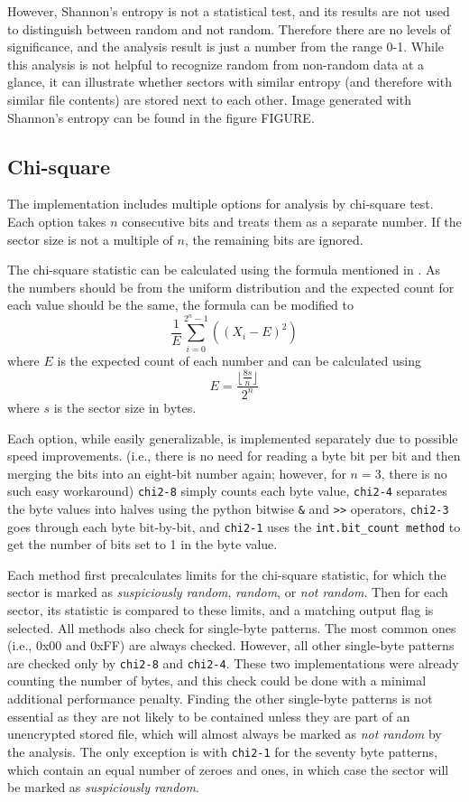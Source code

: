 \documentclass[
  digital, %
  oneside, %
  lof,     %
  lot,     %
]{fithesis4}
\begin{document}
However, Shannon's entropy is not a statistical test, and its results are not used to distinguish between random and not random.
Therefore there are no levels of significance, and the analysis result is just a number from the range 0-1.
While this analysis is not helpful to recognize random from non-random data at a glance, it can illustrate whether sectors with similar entropy (and therefore with similar file contents) are stored next to each other.
Image generated with Shannon's entropy can be found in the figure FIGURE.   %

\subsection{Chi-square}

The implementation includes multiple options for analysis by chi-square test.
Each option takes $n$ consecutive bits and treats them as a separate number.
If the sector size is not a multiple of $n$, the remaining bits are ignored.

The chi-square statistic can be calculated using the formula mentioned in \textbf{}.
As the numbers should be from the uniform distribution and the expected count for each value should be the same, the formula can be modified to
$$\frac{1}{E}\sum_{i = 0}^{2^n - 1}((X_i - E)^2)$$
where $E$ is the expected count of each number and can be calculated using 
$$E = \frac{\lfloor\frac{8s}{n}\rfloor}{2^n}$$
where $s$ is the sector size in bytes.

Each option, while easily generalizable, is implemented separately due to possible speed improvements. 
(i.e., there is no need for reading a byte bit per bit and then merging the bits into an eight-bit number again; however, for $n = 3$, there is no such easy workaround)
\texttt{chi2-8} simply counts each byte value, \texttt{chi2-4} separates the byte values into halves using the python bitwise \texttt{\&} and \texttt{>{>}} operators, \texttt{chi2-3} goes through each byte bit-by-bit, and \texttt{chi2-1} uses the \texttt{int.bit\_count method} to get the number of bits set to 1 in the byte value.

Each method first precalculates limits for the chi-square statistic, for which the sector is marked as \emph{suspiciously random}, \emph{random}, or \emph{not random}.
Then for each sector, its statistic is compared to these limits, and a matching output flag is selected.
All methods also check for single-byte patterns. The most common ones (i.e., 0x00 and 0xFF) are always checked.
However, all other single-byte patterns are checked only by \texttt{chi2-8} and \texttt{chi2-4}.
These two implementations were already counting the number of bytes, and this check could be done with a minimal additional performance penalty.
Finding the other single-byte patterns is not essential as they are not likely to be contained unless they are part of an unencrypted stored file, which will almost always be marked as \emph{not random} by the analysis.
The only exception is with \texttt{chi2-1} for the seventy byte patterns, which contain an equal number of zeroes and ones, in which case the sector will be marked as \emph{suspiciously random}.
\end{document}
